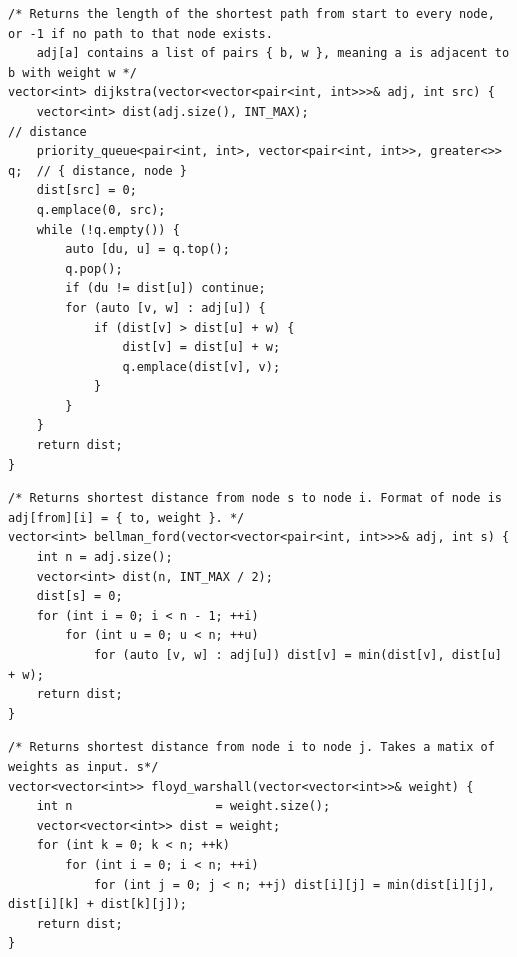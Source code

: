 \documentclass[a4paper,10pt]{article}
\newenvironment{keepfunction}{\begin{samepage}}{\end{samepage}}
\begin{document}
\begin{keepfunction}
\begin{verbatim}
/* Returns the length of the shortest path from start to every node, or -1 if no path to that node exists.
    adj[a] contains a list of pairs { b, w }, meaning a is adjacent to b with weight w */
vector<int> dijkstra(vector<vector<pair<int, int>>>& adj, int src) {
    vector<int> dist(adj.size(), INT_MAX);                                // distance
    priority_queue<pair<int, int>, vector<pair<int, int>>, greater<>> q;  // { distance, node }
    dist[src] = 0;
    q.emplace(0, src);
    while (!q.empty()) {
        auto [du, u] = q.top();
        q.pop();
        if (du != dist[u]) continue;
        for (auto [v, w] : adj[u]) {
            if (dist[v] > dist[u] + w) {
                dist[v] = dist[u] + w;
                q.emplace(dist[v], v);
            }
        }
    }
    return dist;
}
\end{verbatim}
\end{keepfunction}

\begin{keepfunction}
\begin{verbatim}
/* Returns shortest distance from node s to node i. Format of node is adj[from][i] = { to, weight }. */
vector<int> bellman_ford(vector<vector<pair<int, int>>>& adj, int s) {
    int n = adj.size();
    vector<int> dist(n, INT_MAX / 2);
    dist[s] = 0;
    for (int i = 0; i < n - 1; ++i)
        for (int u = 0; u < n; ++u)
            for (auto [v, w] : adj[u]) dist[v] = min(dist[v], dist[u] + w);
    return dist;
}
\end{verbatim}
\end{keepfunction}

\begin{keepfunction}
\begin{verbatim}
/* Returns shortest distance from node i to node j. Takes a matix of weights as input. s*/
vector<vector<int>> floyd_warshall(vector<vector<int>>& weight) {
    int n                    = weight.size();
    vector<vector<int>> dist = weight;
    for (int k = 0; k < n; ++k)
        for (int i = 0; i < n; ++i)
            for (int j = 0; j < n; ++j) dist[i][j] = min(dist[i][j], dist[i][k] + dist[k][j]);
    return dist;
}
\end{verbatim}
\end{keepfunction}
\end{document}
